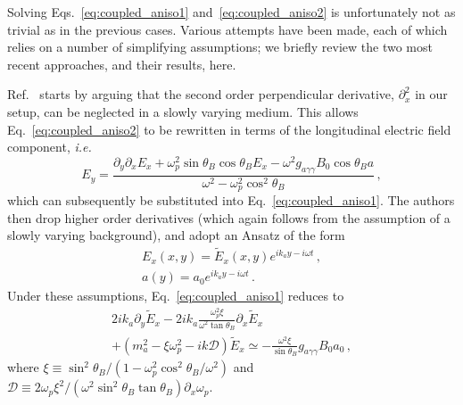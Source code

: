 \documentclass[twocolumn,superscriptaddress,floatfix,preprintnumbers,prd,nofootinbib,aps,10pt]{revtex4-2}
\renewcommand\({\left(}
\renewcommand\){\right)}
\renewcommand\[{\left[}
\renewcommand\]{\right]}
\newcommand\ie{{\it i.e.}~}
\begin{document}
Solving Eqs.~\ref{eq:coupled_aniso1} and~\ref{eq:coupled_aniso2} is unfortunately not as trivial as in the previous cases. Various attempts have been made, each of which relies on a number of simplifying assumptions; we briefly review the two most recent approaches, and their results, here.

Ref.~\cite{millar2021axionphotonUPDATED} starts by arguing that the second order perpendicular derivative, $\partial_x^2$ in our setup, can be neglected in a slowly varying medium. This allows Eq.~\ref{eq:coupled_aniso2} to be rewritten in terms of the longitudinal electric field component, \ie
%
\begin{equation}\label{eq:Ey_full}
    E_y = \frac{\partial_y \partial_x E_x + \omega_p^2 \sin\theta_B \cos\theta_B E_x - \omega^2 g_{a\gamma\gamma} B_0 \cos\theta_B a}{\omega^2 - \omega_p^2 \cos^2\theta_B} \, ,
\end{equation}
%
which can subsequently be substituted into Eq.~\ref{eq:coupled_aniso1}. The authors then drop higher order derivatives (which again follows from the assumption of a slowly varying background), and adopt an Ansatz of the form
%
\begin{gather}
    E_x(x,y) = \tilde{E}_x(x,y) e^{i k_a y - i \omega t} \, , \\
    a(y) = a_0 e^{i k_a y - i \omega t} \, .
\end{gather}
%
Under these assumptions, Eq.~\ref{eq:coupled_aniso1} reduces to
%
\begin{multline}\label{eq:alex_oneeq}
    2 i k_a \partial_y \tilde{E}_x - 2 i k_a \frac{\omega_p^2 \xi}{\omega^2 \tan\theta_B} \partial_x \tilde{E}_x \\
    + (m_a^2 - \xi \omega_p^2 - ik \mathcal{D}) \tilde{E}_x \simeq - \frac{\omega^2 \xi}{\sin\theta_B} g_{a\gamma\gamma} B_0 a_0 \, ,
\end{multline}
%
where $\xi \equiv \sin^2\theta_B / (1- \omega_p^2 \cos^2\theta_B / \omega^2)$ and $\mathcal{D} \equiv 2 \omega_p \xi^2 / (\omega^2 \sin^2\theta_B \tan\theta_B) \partial_x \omega_p$. 
\end{document}
